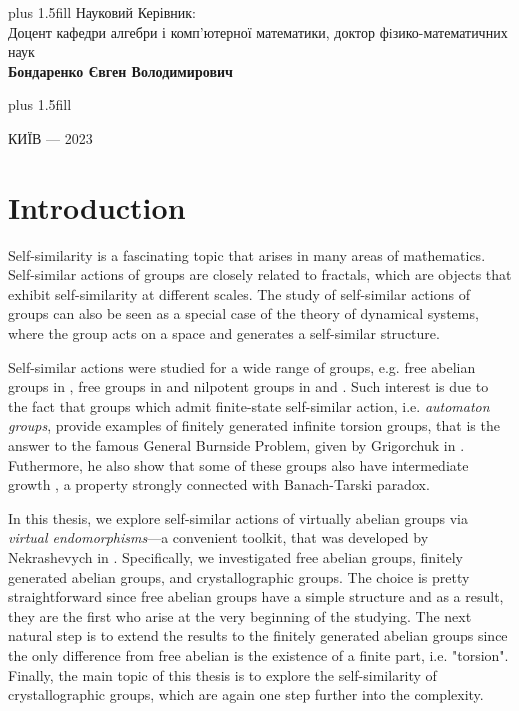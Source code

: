 \documentclass[a4paper,12pt]{amsart}
\theoremstyle{definition}
\begin{document}
	
	\vskip0cm plus 1.5fill
	\hangindent=7cm  \noindent
	Науковий Керівник:\\
	Доцент кафедри алгебри і комп'ютерної математики, доктор фiзико-математичних наук\\
	{\bf Бондаренко Євген Володимирович}
	
	
	
	\vskip5cm plus 1.5fill
	\begin{center}
		КИЇВ --- 2023
	\end{center}
	
	\newpage
	
	\tableofcontents
	\listoftables
	
	
	\newpage
	
	
	\section{Introduction}
	
	Self-similarity is a fascinating topic that arises in many areas of mathematics.  Self-similar actions of groups are closely related to fractals, which are objects that exhibit self-similarity at different scales. The study of self-similar actions of groups can also be seen as a special case of the theory of dynamical systems, where the group acts on a space and generates a self-similar structure.
	
	Self-similar actions were studied for a wide range of groups, e.g. free abelian groups in \cite{Nekrashevych: 1/2-endomorphisms}, free groups in \cite{self-similar:free groups} and nilpotent groups in \cite{nilpotent_kernel} and \cite{Bond: nilpotent_groups}. Such interest is due to the fact that groups which admit finite-state self-similar action, i.e. \textit{automaton groups}, provide examples of finitely generated infinite torsion groups, that is the answer to the famous General Burnside Problem, given by Grigorchuk in \cite{Grygorchuk:original}. Futhermore, he also show that some of these groups also have intermediate growth \cite{Grygorchuk:growth}, a property strongly connected with Banach-Tarski paradox. 
	
	In this thesis, we explore self-similar actions of virtually abelian groups via \textit{virtual endomorphisms}---a convenient toolkit, that was developed by Nekrashevych in \cite{Nekrashevych:self-similar}. Specifically, we investigated free abelian groups, finitely generated abelian groups, and crystallographic groups. The choice is pretty straightforward since free abelian groups have a simple structure and as a result, they are the first who arise at the very beginning of the studying. The next natural step is to extend the results to the finitely generated abelian groups since the only difference from free abelian is the existence of a finite part, i.e. "torsion". Finally, the main topic of this thesis is to explore the self-similarity of crystallographic groups, which are again one step further into the complexity. 
	
\end{document}
